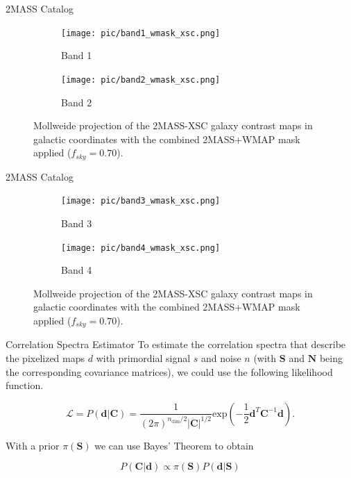 \documentclass[serif, aspectratio=169]{beamer}
\begin{document}
\begin{frame}{2MASS Catalog}
    \begin{figure}
     \centering
     \begin{subfigure}[t]{0.49\textwidth}
         \centering
         \texttt{[image: pic/band1\_wmask\_xsc.png]}
         \caption{Band 1}
         \label{fig:contrast_map1}
     \end{subfigure}
     \hfill
     \begin{subfigure}[t]{0.49\textwidth}
         \centering
         \texttt{[image: pic/band2\_wmask\_xsc.png]}
         \caption{Band 2}
         \label{fig:contrast_map2}
     \end{subfigure}
     \caption{Mollweide projection of the 2MASS-XSC galaxy contrast maps in galactic coordinates with the combined 2MASS+WMAP mask applied ($f_{sky}=0.70$).}
        \label{fig:2MASS_maps1}
      \end{figure}
\end{frame}

\begin{frame}{2MASS Catalog}
    \begin{figure}
    \centering
        \begin{subfigure}[b]{0.49\textwidth}
             \centering
             \texttt{[image: pic/band3\_wmask\_xsc.png]}
             \caption{Band 3}
             \label{fig:contrast_map3}
        \end{subfigure}
        \hfill
        \begin{subfigure}[b]{0.49\textwidth}
             \centering
             \texttt{[image: pic/band4\_wmask\_xsc.png]}
             \caption{Band 4}
             \label{fig:contrast_map4}
        \end{subfigure}
    \caption{Mollweide projection of the 2MASS-XSC galaxy contrast maps in galactic coordinates with the combined 2MASS+WMAP mask applied ($f_{sky}=0.70$).}
    \label{fig:2MASS_maps2}
    \end{figure}
\end{frame}

\begin{frame}{Correlation Spectra Estimator}
	To estimate the correlation spectra that describe the pixelized maps $d$ with primordial signal $s$ and noise $n$ (with $\mathbf{S}$ and $\mathbf{N}$ being the corresponding covariance matrices), we could use the following likelihood function.

	\begin{equation}\label{ch4:Likelihood}
	\mathcal{L}=P(\mathbf{d}|\mathbf{C})=\frac{1}{(2\pi)^{n_\text{dim}/2}|\mathbf{C}|^{1/2}}\text{exp}\left(-\frac{1}{2}\mathbf{d}^T \mathbf{C}^{-1} \mathbf{d}\right).
	\end{equation}	

	With a prior $\pi(\mathbf{S})$ we can use Bayes' Theorem to obtain
	
	\begin{equation}
	P(\mathbf{C}|\mathbf{d})\propto \pi(\mathbf{S})P(\mathbf{d}|\mathbf{S})
	\end{equation}	 
\end{frame}
\end{document}
